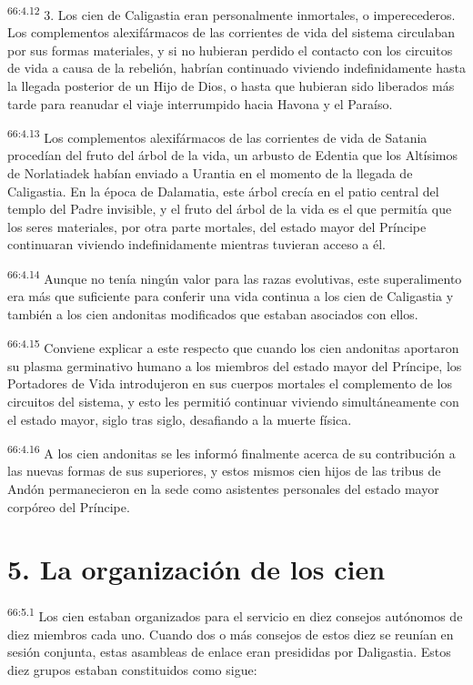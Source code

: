 \par
\textsuperscript{66:4.12} 3. Los cien de Caligastia eran personalmente inmortales, o imperecederos. Los complementos alexifármacos de las corrientes de vida del sistema circulaban por sus formas materiales, y si no hubieran perdido el contacto con los circuitos de vida a causa de la rebelión, habrían continuado viviendo indefinidamente hasta la llegada posterior de un Hijo de Dios, o hasta que hubieran sido liberados más tarde para reanudar el viaje interrumpido hacia Havona y el Paraíso.

\par
\textsuperscript{66:4.13} Los complementos alexifármacos de las corrientes de vida de Satania procedían del fruto del árbol de la vida, un arbusto de Edentia que los Altísimos de Norlatiadek habían enviado a Urantia en el momento de la llegada de Caligastia. En la época de Dalamatia, este árbol crecía en el patio central del templo del Padre invisible, y el fruto del árbol de la vida es el que permitía que los seres materiales, por otra parte mortales, del estado mayor del Príncipe continuaran viviendo indefinidamente mientras tuvieran acceso a él.

\par
\textsuperscript{66:4.14} Aunque no tenía ningún valor para las razas evolutivas, este superalimento era más que suficiente para conferir una vida continua a los cien de Caligastia y también a los cien andonitas modificados que estaban asociados con ellos.

\par
\textsuperscript{66:4.15} Conviene explicar a este respecto que cuando los cien andonitas aportaron su plasma germinativo humano a los miembros del estado mayor del Príncipe, los Portadores de Vida introdujeron en sus cuerpos mortales el complemento de los circuitos del sistema, y esto les permitió continuar viviendo simultáneamente con el estado mayor, siglo tras siglo, desafiando a la muerte física.

\par
\textsuperscript{66:4.16} A los cien andonitas se les informó finalmente acerca de su contribución a las nuevas formas de sus superiores, y estos mismos cien hijos de las tribus de Andón permanecieron en la sede como asistentes personales del estado mayor corpóreo del Príncipe.

\section*{5. La organización de los cien}
\par
\textsuperscript{66:5.1} Los cien estaban organizados para el servicio en diez consejos autónomos de diez miembros cada uno. Cuando dos o más consejos de estos diez se reunían en sesión conjunta, estas asambleas de enlace eran presididas por Daligastia. Estos diez grupos estaban constituidos como sigue:

